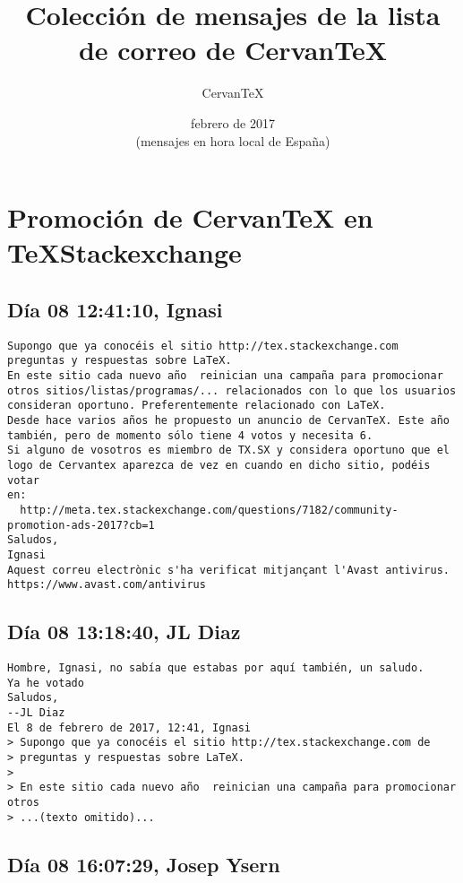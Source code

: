 \documentclass[a4paper,10pt]{article}
\author{CervanTeX}
\title{Colección de mensajes de la lista de correo de CervanTeX}
\date{febrero de 2017\\ \footnotesize{(mensajes en hora local de España)}}
\begin{document}
\maketitle

\tableofcontents

\section{Promoción de CervanTeX en TeXStackexchange}

\subsection{Día 08 12:41:10, Ignasi}

\begin{lstlisting}
Supongo que ya conocéis el sitio http://tex.stackexchange.com
preguntas y respuestas sobre LaTeX.
En este sitio cada nuevo año  reinician una campaña para promocionar 
otros sitios/listas/programas/... relacionados con lo que los usuarios 
consideran oportuno. Preferentemente relacionado con LaTeX.
Desde hace varios años he propuesto un anuncio de CervanTeX. Este año 
también, pero de momento sólo tiene 4 votos y necesita 6.
Si alguno de vosotros es miembro de TX.SX y considera oportuno que el 
logo de Cervantex aparezca de vez en cuando en dicho sitio, podéis votar 
en:
  http://meta.tex.stackexchange.com/questions/7182/community-promotion-ads-2017?cb=1
Saludos,
Ignasi
Aquest correu electrònic s'ha verificat mitjançant l'Avast antivirus.
https://www.avast.com/antivirus

\end{lstlisting}

\subsection{Día 08 13:18:40, JL Diaz}

\begin{lstlisting}
Hombre, Ignasi, no sabía que estabas por aquí también, un saludo.
Ya he votado
Saludos,
--JL Diaz
El 8 de febrero de 2017, 12:41, Ignasi 
> Supongo que ya conocéis el sitio http://tex.stackexchange.com de
> preguntas y respuestas sobre LaTeX.
>
> En este sitio cada nuevo año  reinician una campaña para promocionar otros
> ...(texto omitido)...

\end{lstlisting}

\subsection{Día 08 16:07:29, Josep Ysern}
\end{document}
